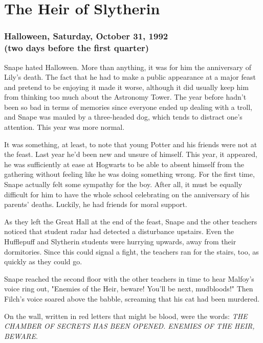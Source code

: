 
\chapter{The Heir of Slytherin}

\subsection{Halloween, Saturday, October 31, 1992 \\ (two days before the first quarter)}

Snape hated Halloween. More than anything, it was for him the anniversary of Lily's death. The fact that he had to make a public appearance at a major feast and pretend to be enjoying it made it worse, although it did usually keep him from thinking too much about the Astronomy Tower. The year before hadn't been so bad in terms of memories since everyone ended up dealing with a troll, and Snape was mauled by a three-headed dog, which tends to distract one's attention. This year was more normal.

It was something, at least, to note that young Potter and his friends were not at the feast. Last year he'd been new and unsure of himself. This year, it appeared, he was sufficiently at ease at Hogwarts to be able to absent himself from the gathering without feeling like he was doing something wrong. For the first time, Snape actually felt some sympathy for the boy. After all, it must be equally difficult for him to have the whole school celebrating on the anniversary of his parents' deaths. Luckily, he had friends for moral support.

As they left the Great Hall at the end of the feast, Snape and the other teachers noticed that student radar had detected a disturbance upstairs. Even the Hufflepuff and Slytherin students were hurrying upwards, away from their dormitories. Since this could signal a fight, the teachers ran for the stairs, too, as quickly as they could go.

Snape reached the second floor with the other teachers in time to hear Malfoy's voice ring out, "Enemies of the Heir, beware! You'll be next, mudbloods!" Then Filch's voice soared above the babble, screaming that his cat had been murdered.

On the wall, written in red letters that might be blood, were the words: \emph{THE CHAMBER OF SECRETS HAS BEEN OPENED. ENEMIES OF THE HEIR, BEWARE}.

